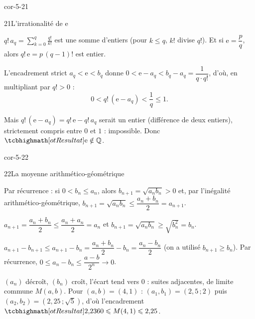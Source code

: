 \begin{blocLivre}{cor-5-21}
\begin{corrige}{21}{L'irrationalité de e}
\begin{questions}
  \item $q!\,a_q=\displaystyle\sum_{k=0}^{q}\frac{q!}{k!}$ est une somme d'entiers
    (pour $k\leq q$, $k!$ divise $q!$). Et si $\mathrm{e}=\dfrac{p}{q}$,
    alors $q!\,\mathrm{e}=p\,(q-1)!$ est entier.
  \item L'encadrement strict $a_q<\mathrm{e}<b_q$ donne
    $0<\mathrm{e}-a_q<b_q-a_q=\dfrac{1}{q\cdot q!}$, d'où, en multipliant
    par $q!>0$ :
    \[
      0<q!\,(\mathrm{e}-a_q)<\frac1q\leq1.
    \]
  \item Mais $q!\,(\mathrm{e}-a_q)=q!\,\mathrm{e}-q!\,a_q$ serait un entier
    (différence de deux entiers), strictement compris entre $0$ et $1$ :
    impossible. Donc $\res{\mathrm{e}\notin\Q}$.
\end{questions}
\end{corrige}
\end{blocLivre}

\begin{blocLivre}{cor-5-22}
\begin{corrige}{22}{La moyenne arithmético-géométrique}
\begin{questions}
  \item Par récurrence : si $0<b_n\leq a_n$, alors $b_{n+1}=\sqrt{a_nb_n}>0$
    et, par l'inégalité arithmético-géométrique,
    $b_{n+1}=\sqrt{a_nb_n}\leq\dfrac{a_n+b_n}{2}=a_{n+1}$.
  \item $a_{n+1}=\dfrac{a_n+b_n}{2}\leq\dfrac{a_n+a_n}{2}=a_n$ et
    $b_{n+1}=\sqrt{a_nb_n}\geq\sqrt{b_n^{2}}=b_n$.
  \item $a_{n+1}-b_{n+1}\leq a_{n+1}-b_n=\dfrac{a_n+b_n}{2}-b_n
    =\dfrac{a_n-b_n}{2}$ (on a utilisé $b_{n+1}\geq b_n$). Par récurrence,
    $0\leq a_n-b_n\leq\dfrac{a-b}{2^{n}}\to0$.
  \item $(a_n)$ décroît, $(b_n)$ croît, l'écart tend vers $0$ : suites
    adjacentes, de limite commune $M(a,b)$. Pour $(a,b)=(4,1)$ :
    $(a_1,b_1)=(2{,}5\,;2)$ puis $(a_2,b_2)=(2{,}25\,;\sqrt5)$, d'où
    l'encadrement $\res{2{,}2360\leq M(4,1)\leq2{,}25}$.
\end{questions}
\end{corrige}
\end{blocLivre}

